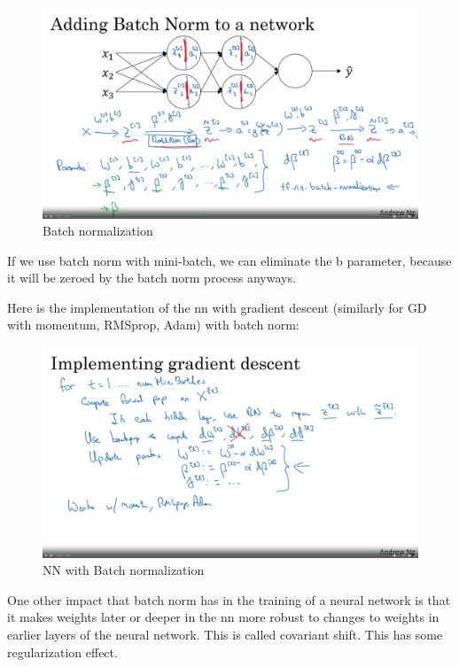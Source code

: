 \documentclass[12pt]{report}
\begin{document}
\begin{figure}[H]
  \centering
  \includegraphics[trim =0.0cm 0.0cm 0.0cm 0.0cm, clip, scale=0.12]{pics/batchNorm.png}
  \caption{Batch normalization}
\end{figure}

If we use batch norm with mini-batch, we can eliminate the b parameter, because it will be zeroed by the batch norm process anyways.

Here is the implementation of the nn with gradient descent (similarly for GD with momentum, RMSprop, Adam) with batch norm:

\begin{figure}[H]
  \centering
  \includegraphics[trim =0.0cm 0.0cm 0.0cm 0.0cm, clip, scale=0.12]{pics/NN_with_batchNorm.png}
  \caption{NN with Batch normalization}
\end{figure}

One other impact that batch norm has in the training of a neural network is that it makes weights later or deeper in the nn more robust to changes to weights in earlier layers of the neural network. This is called covariant shift. This has some regularization effect.
\end{document}
